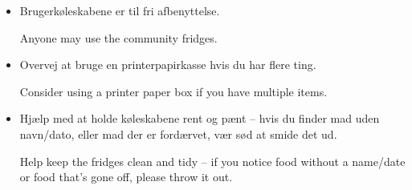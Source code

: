 \documentclass{article}
\begin{document}
\maketitle

\null
\vspace{-1cm}

\huge


\english

\vspace{-1.5cm}


\vspace{-0.5cm}

\dansk

\begin{itemize}


\item Brugerkøleskabene er til fri afbenyttelse.

\english Anyone may use the community fridges.


\dansk \item Overvej at bruge en printerpapirkasse hvis du har flere ting.

\english Consider using a printer paper box if you have multiple items.

\dansk \item Hjælp med at holde køleskabene rent og pænt -- hvis du finder mad
uden navn/dato, eller mad der er fordærvet, vær sød at smide det ud.

\english Help keep the fridges clean and tidy -- if you notice food without a
name/date or food that's gone off, please throw it out.

\end{itemize}

\underskriv
\end{document}
